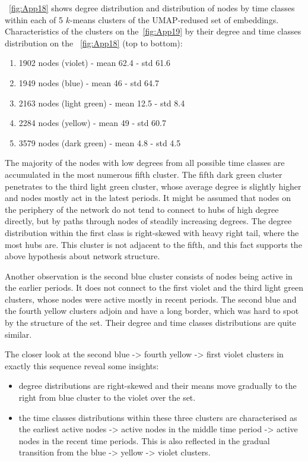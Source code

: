 ~\autoref{fig:App18} shows degree distribution and distribution of nodes by time classes within each of 5 $k$-means clusters of the UMAP-redused set of embeddings. Characteristics of the clusters on the~\autoref{fig:App19} by their degree and time classes distribution on the ~\autoref{fig:App18} (top to bottom):
    \begin{enumerate}
        \item 1902 nodes (violet) - mean 62.4 - std 61.6
        \item 1949 nodes (blue) - mean 46 - std 64.7
        \item 2163 nodes (light green) - mean 12.5 - std 8.4
        \item 2284 nodes (yellow) - mean 49 - std 60.7
        \item 3579 nodes (dark green) - mean 4.8 - std 4.5
    \end{enumerate}
The majority of the nodes with low degrees from all possible time classes are accumulated in the most numerous fifth cluster. The fifth dark green cluster penetrates to the third light green cluster, whose average degree is slightly higher and nodes mostly act in the latest periods. It might be assumed that nodes on the periphery of the network do not tend to connect to hubs of high degree directly, but by paths through nodes of steadily increasing degrees. The degree distribution within the first class is right-skewed with heavy right tail, where the most hubs are. This cluster is not adjacent to the fifth, and this fact supports the above hypothesis about network structure.

Another observation is the second blue cluster consists of nodes being active in the earlier periods. It does not connect to the first violet and the third light green clusters, whose nodes were active mostly in recent periods. The second blue and the fourth yellow clusters adjoin and have a long border, which was hard to spot by the structure of the set. Their degree and time classes distributions are quite similar. 

The closer look at the second blue -> fourth yellow -> first violet clusters in exactly this sequence reveal some insights: 
\begin{itemize}
    \item degree distributions are right-skewed and their means move gradually to the right from blue cluster to the violet over the set.
    \item the time classes distributions within these three clusters are characterised as the earliest active nodes -> active nodes in the middle time period -> active nodes in the recent time periods. This is also reflected in the gradual transition from the blue -> yellow -> violet clusters.
\end{itemize}

